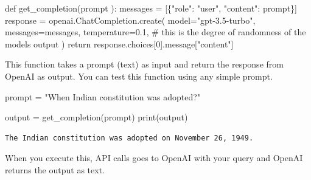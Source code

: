 \documentclass[
  letterpaper,
  DIV=11,
  numbers=noendperiod]{scrreprt}
\newenvironment{Shaded}{\begin{snugshade}}{\end{snugshade}}
\newcommand{\BuiltInTok}[1]{\textcolor[rgb]{0.00,0.23,0.31}{#1}}
\newcommand{\CommentTok}[1]{\textcolor[rgb]{0.37,0.37,0.37}{#1}}
\newcommand{\ControlFlowTok}[1]{\textcolor[rgb]{0.00,0.23,0.31}{#1}}
\newcommand{\DecValTok}[1]{\textcolor[rgb]{0.68,0.00,0.00}{#1}}
\newcommand{\FloatTok}[1]{\textcolor[rgb]{0.68,0.00,0.00}{#1}}
\newcommand{\KeywordTok}[1]{\textcolor[rgb]{0.00,0.23,0.31}{#1}}
\newcommand{\NormalTok}[1]{\textcolor[rgb]{0.00,0.23,0.31}{#1}}
\newcommand{\OperatorTok}[1]{\textcolor[rgb]{0.37,0.37,0.37}{#1}}
\newcommand{\StringTok}[1]{\textcolor[rgb]{0.13,0.47,0.30}{#1}}
\begin{document}
\begin{Shaded}
\begin{Highlighting}[]
\KeywordTok{def}\NormalTok{ get\_completion(prompt ):}
\NormalTok{    messages }\OperatorTok{=}\NormalTok{ [\{}\StringTok{"role"}\NormalTok{: }\StringTok{"user"}\NormalTok{, }\StringTok{"content"}\NormalTok{: prompt\}]}
\NormalTok{    response }\OperatorTok{=}\NormalTok{ openai.ChatCompletion.create(}
\NormalTok{        model}\OperatorTok{=}\StringTok{"gpt{-}3.5{-}turbo"}\NormalTok{,}
\NormalTok{        messages}\OperatorTok{=}\NormalTok{messages,}
\NormalTok{        temperature}\OperatorTok{=}\FloatTok{0.1}\NormalTok{, }\CommentTok{\# this is the degree of randomness of the model\textquotesingle{}s output}
\NormalTok{    )}
    \ControlFlowTok{return}\NormalTok{ response.choices[}\DecValTok{0}\NormalTok{].message[}\StringTok{"content"}\NormalTok{]}
\end{Highlighting}
\end{Shaded}

This function takes a prompt (text) as input and return the response
from OpenAI as output. You can test this function using any simple
prompt.

\begin{Shaded}
\begin{Highlighting}[]
\NormalTok{prompt }\OperatorTok{=} \StringTok{"When Indian constitution was adopted?"}

\NormalTok{output }\OperatorTok{=}\NormalTok{ get\_completion(prompt)}
\BuiltInTok{print}\NormalTok{(output)}
\end{Highlighting}
\end{Shaded}

\begin{tcolorbox}[enhanced jigsaw, coltitle=black, breakable, opacityback=0, bottomrule=.15mm, left=2mm, leftrule=.75mm, toptitle=1mm, colbacktitle=quarto-callout-note-color!10!white, toprule=.15mm, rightrule=.15mm, colback=white, titlerule=0mm, colframe=quarto-callout-note-color-frame, title={Output}, arc=.35mm, opacitybacktitle=0.6, bottomtitle=1mm]

\begin{verbatim}
The Indian constitution was adopted on November 26, 1949.
\end{verbatim}

\end{tcolorbox}

When you execute this, API calls goes to OpenAI with your query and
OpenAI returns the output as text.
\end{document}
